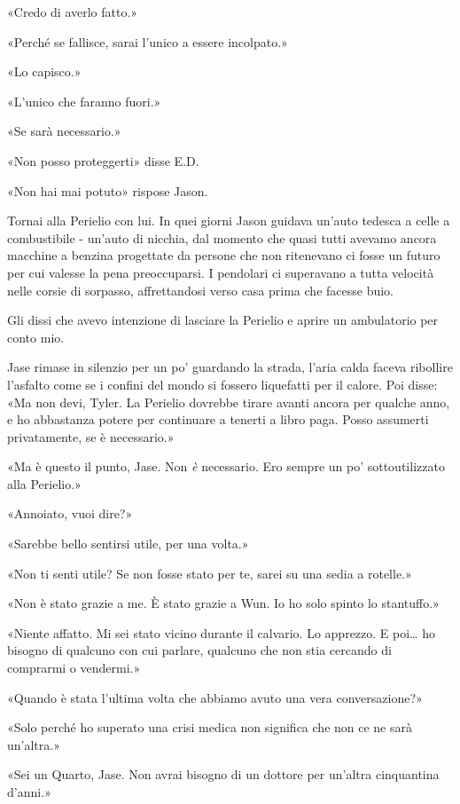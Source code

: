 «Credo di averlo fatto.»

«Perché se fallisce, sarai l'unico a essere incolpato.»

«Lo capisco.»

«L'unico che faranno fuori.»

«Se sarà necessario.»

«Non posso proteggerti» disse E.D.

«Non hai mai potuto» rispose Jason.

\separatorefiori

Tornai alla Perielio con lui. In quei giorni Jason guidava un'auto
tedesca a celle a combustibile - un'auto di nicchia, dal momento che
quasi tutti avevamo ancora macchine a benzina progettate da persone che
non ritenevano ci fosse un futuro per cui valesse la pena preoccuparsi.
I pendolari ci superavano a tutta velocità nelle corsie di sorpasso,
affrettandosi verso casa prima che facesse buio.

Gli dissi che avevo intenzione di lasciare la Perielio e aprire un
ambulatorio per conto mio.

Jase rimase in silenzio per un po' guardando la strada, l'aria calda
faceva ribollire l'asfalto come se i confini del mondo si fossero
liquefatti per il calore. Poi disse: «Ma non devi, Tyler. La Perielio
dovrebbe tirare avanti ancora per qualche anno, e ho abbastanza potere
per continuare a tenerti a libro paga. Posso assumerti privatamente, se
è necessario.»

«Ma è questo il punto, Jase. Non \emph{è} necessario. Ero sempre un po'
sottoutilizzato alla Perielio.»

«Annoiato, vuoi dire?»

«Sarebbe bello sentirsi utile, per una volta.»

«Non ti senti utile? Se non fosse stato per te, sarei su una sedia a
rotelle.»

«Non è stato grazie a me. È stato grazie a Wun. Io ho solo spinto lo
stantuffo.»

«Niente affatto. Mi sei stato vicino durante il calvario. Lo apprezzo. E
poi\ldots{} ho bisogno di qualcuno con cui parlare, qualcuno che non
stia cercando di comprarmi o vendermi.»

«Quando è stata l'ultima volta che abbiamo avuto una vera
conversazione?»

«Solo perché ho superato una crisi medica non significa che non ce ne
sarà un'altra.»

«Sei un Quarto, Jase. Non avrai bisogno di un dottore per un'altra
cinquantina d'anni.»

